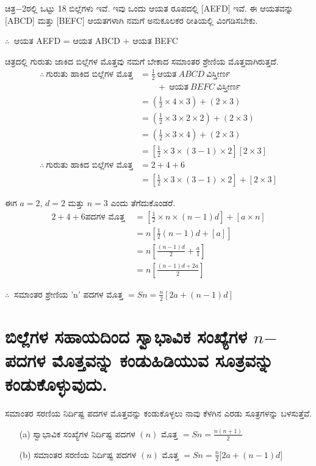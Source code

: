 ಚಿತ್ರ$-$2ರಲ್ಲಿ ಒಟ್ಟು 18 ಬಿಲ್ಲೆಗಳು ಇವೆ. ಇವು ಒಂದು ಆಯತ ರೂಪದಲ್ಲಿ [AEFD] ಇವೆ. ಈ ಆಯತವನ್ನು [ABCD] ಮತ್ತು [BEFC] ಆಯತಗಳಾಗಿ ನಮಗೆ ಅನುಕೂಲಕರ ರೀತಿಯಲ್ಲಿ ವಿಂಗಡಿಸಬೇಕು. 

$\therefore~$ ಆಯತ AEFD = ಆಯತ ABCD + ಆಯತ BEFC

ಚಿತ್ರದಲ್ಲಿ ಗುರುತು ಜಾಕಿದ ಬಿಲ್ಲೆಗಳ ಮೊತ್ತವು ನಮಗೆ ಬೇಕಾದ ಸಮಾಂತರ ಶ್ರೇಣಿಯ ಮೊತ್ತವಾಗಿರುತ್ತದೆ. 
\begin{align*}
\therefore~ \text{ಗುರುತು ಹಾಕಿದ ಬಿಲ್ಲೆಗಳ ಮೊತ್ತ} & = \frac{1}{2} ~\text{ಆಯತ}~ ABCD ~\text{ವಿಸ್ತೀರ್ಣ}~ \\
& \qquad + ~\text{ಆಯತ}~ BEFC ~\text{ವಿಸ್ತೀರ್ಣ}\\
& = \left(\frac{1}{2} \times 4 \times 3 \right) + (2 \times 3)\\
& = \left(\frac{1}{2} \times 3 \times 2 \times 2\right) + (2 \times 3)\\
& = \left(\frac{1}{2} \times 3 \times 4 \right) + (2 \times 3)\\
& = \left[\frac{1}{2} \times 3 \times (3-1) \times 2 \right][2 \times 3]\\
\therefore~ \text{ಗುರುತು ಹಾಕಿದ ಬಿಲ್ಲೆಗಳ ಮೊತ್ತ} & = 2 + 4 + 6\\
& = \left[\frac{1}{2} \times 3 \times (3-1) \times 2 \right] + [2 \times 3]
\end{align*}

ಈಗ $a = 2$, $d = 2$ ಮತ್ತು $n = 3$ ಎಂದು ತೆಗೆದುಕೊಂಡರೆ. 
\begin{align*}
2 + 4 + 6 \text{ಪದಗಳ ಮೊತ್ತ } & = \left[\frac{1}{2} \times n \times (n-1)d \right] + [a \times n]\\
& = n \left[\frac{1}{2} (n - 1)d + [a]\right]\\
& = n \left[\frac{(n-1)d}{2} + \frac{a}{1} \right]\\
& = n \left[\frac{(n-1)d + 2a}{2} \right]
\end{align*}

$\therefore~$ ಸಮಾಂತರ ಶ್ರೇಣಿಯ 'n' ಪದಗಳ ಮೊತ್ತ $= Sn = \frac{n}{2} [2a + (n-1)d]$

\section*{ಬಿಲ್ಲೆಗಳ ಸಹಾಯದಿಂದ ಸ್ವಾಭಾವಿಕ ಸಂಖ್ಯೆಗಳ $n$$-$ಪದಗಳ ಮೊತ್ತವನ್ನು ಕಂಡು\break ಹಿಡಿಯುವ ಸೂತ್ರವನ್ನು ಕಂಡುಕೊಳ್ಳುವುದು.}

ಸಮಾಂತರ ಸರಣಿಯ ನಿರ್ದಿಷ್ಟ ಪದಗಳ ಮೊತ್ತವನ್ನು ಕಂಡುಕೊಳ್ಳಲು ನಾವು ಕೆಳಗಿನ ಎರಡು ಸೂತ್ರಗಳನ್ನು ಬಳಸುತ್ತೆವೆ.
\begin{itemize}
\item [(a)] ಸ್ವಾಭಾವಿಕ ಸಂಖ್ಯೆಗಳ ನಿರ್ದಿಷ್ಟ ಪದಗಳ $(n)$ ಮೊತ್ತ $= Sn = \frac{n(n+1)}{2}$
\item [(b)] ಸಮಾಂತರ ಸರಣಿಯ ನಿರ್ದಿಷ್ಟ ಪದಗಳ $(n)$ ಮೊತ್ತ {\small$= Sn = \frac{n}{2} [2a +$\break $(n-1)d]$}
\end{itemize}

